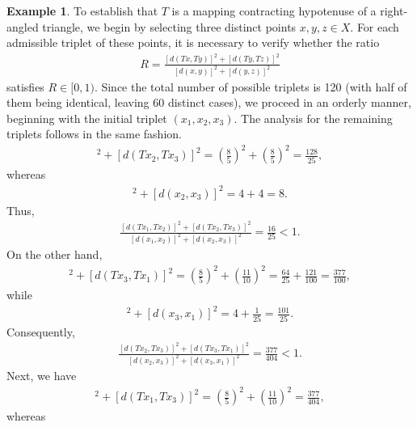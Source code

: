 \documentclass[11pt,reqno,a4paper]{amsart}
\theoremstyle{plain}
\theoremstyle{definition}
\newtheorem{example}[theorem]{Example}
\theoremstyle{remark}
\numberwithin{equation}{section}
\begin{document}
\begin{example}
To establish that $T$ is a mapping contracting hypotenuse of a right-angled triangle, we begin by selecting three distinct points $x, y, z \in X$. For each admissible triplet of these points, it is necessary to verify whether the ratio
\begin{align*}
    R=\frac{[d(Tx,Ty)]^2 +[d(Ty,Tz)]^2}{[d(x,y)]^2 +[d(y,z)]^2}
\end{align*}
satisfies $R \in [0,1)$. Since the total number of possible triplets is 120 (with half of them being identical, leaving 60 distinct cases), we proceed in an orderly manner, beginning with the initial triplet $(x_{1}, x_{2}, x_{3})$. The analysis for the remaining triplets follows in the same fashion.
\begin{align*}
[d(Tx_1,Tx_2)]^2+[d(Tx_2,Tx_3)]^2
=\left(\frac{8}{5}\right)^2+
  \left(\frac{8}{5}\right)^2
=\frac{128}{25},
\end{align*}
whereas
\begin{align*}
    [d(x_1,x_2)]^2+[d(x_2,x_3)]^2 =4+4=8.
\end{align*}
Thus,
\begin{align*}
    \frac{[d(Tx_1,Tx_2)]^2+[d(Tx_2,Tx_3)]^2}{[d(x_1,x_2)]^2+[d(x_2,x_3)]^2}=\frac{16}{25}<1.
\end{align*}
On the other hand,
\begin{align*}
[d(Tx_2,Tx_3)]^2+[d(Tx_3,Tx_1)]^2
=\left(\frac{8}{5}\right)^2+
  \left(\frac{11}{10}\right)^2
=\frac{64}{25}+\frac{121}{100}
=\frac{377}{100},
\end{align*}
while
\begin{align*}
[d(x_2,x_3)]^2+[d(x_3,x_1)]^2
=4+\frac{1}{25}
=\frac{101}{25}.
\end{align*}
Consequently,
\begin{align*}
    \frac{[d(Tx_2,Tx_3)]^2+[d(Tx_3,Tx_1)]^2}{[d(x_2,x_3)]^2+[d(x_3,x_1)]^2}
    =\frac{377}{404}<1.
\end{align*}
Next, we have
\begin{align*}
[d(Tx_2,Tx_1)]^2+[d(Tx_1,Tx_3)]^2
=\left(\frac{8}{5}\right)^2 + \left(\frac{11}{10}\right)^2
=\frac{377}{404},
\end{align*}
whereas
\begin{align*}

\end{align*}
\end{example}
\end{document}
